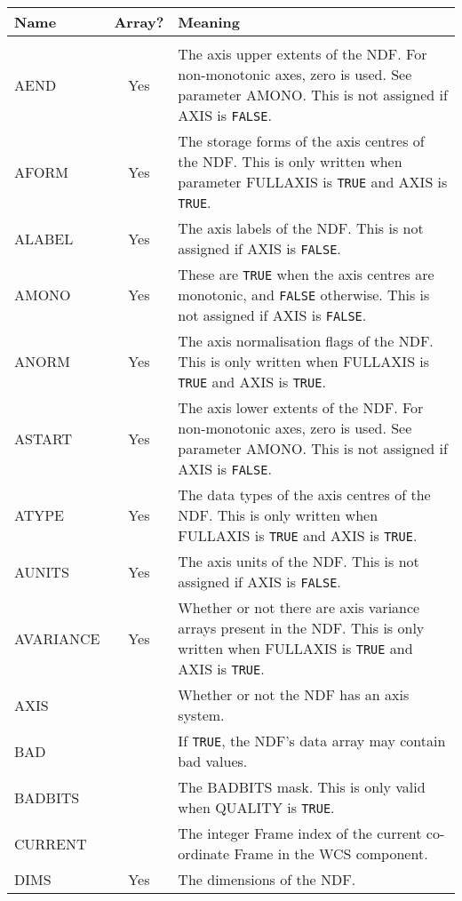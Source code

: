 \documentclass[twoside,11pt,nolof]{starlink}
\begin{document}
\newpage
\begin{center}
\begin{tabular}{lcp{112mm}}
Name & Array? & Meaning \\ \hline
\\
AEND & Yes & The axis upper extents of the NDF.  For non-monotonic axes,
             zero is used.  See parameter AMONO.  This is not assigned if
             AXIS is \texttt{FALSE}. \\
AFORM & Yes & The storage forms of the axis centres of the NDF.  This is
              only written when parameter FULLAXIS is \texttt{TRUE} and AXIS
              is \texttt{TRUE}. \\
ALABEL & Yes & The axis labels of the NDF.  This is not assigned if AXIS is
               \texttt{FALSE}. \\
AMONO & Yes &  These are \texttt{TRUE} when the axis centres are monotonic, and \texttt{FALSE}
               otherwise.  This is not assigned if AXIS is \texttt{FALSE}. \\
ANORM & Yes &  The axis normalisation flags of the NDF.  This is only written
               when FULLAXIS is \texttt{TRUE} and AXIS is \texttt{TRUE}. \\
ASTART & Yes &  The axis lower extents of the NDF.  For non-monotonic axes,
                zero is used.  See parameter AMONO.  This is not assigned if
                AXIS is \texttt{FALSE}. \\
ATYPE & Yes & The data types of the axis centres of the NDF.  This is only
              written when FULLAXIS is \texttt{TRUE} and AXIS is \texttt{TRUE}. \\
AUNITS & Yes & The axis units of the NDF.  This is not assigned if AXIS is
               \texttt{FALSE}. \\
AVARIANCE & Yes & Whether or not there are axis variance arrays present in the
                  NDF.  This is only written when FULLAXIS is \texttt{TRUE} and AXIS is
                  \texttt{TRUE}.\\
AXIS & & Whether or not the NDF has an axis system. \\
BAD & & If \texttt{TRUE}, the NDF's data array may contain bad values. \\
BADBITS & & The BADBITS mask.  This is only valid when QUALITY is \texttt{TRUE}. \\
CURRENT & &  The integer Frame index of the current co-ordinate Frame
             in the WCS component. \\
DIMS & Yes & The dimensions of the NDF. \\

\end{tabular}
\end{center}
\end{document}

